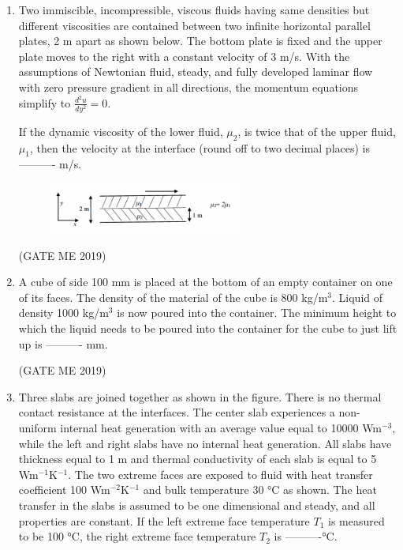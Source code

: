 \documentclass[journal]{IEEEtran}
\begin{document}
\begin{enumerate}
\item Two immiscible, incompressible, viscous fluids having same densities but different viscosities are contained between two infinite horizontal parallel plates, 2 m apart as shown below. The bottom plate is fixed and the upper plate moves to the right with a constant velocity of 3 m/s. With the assumptions of Newtonian fluid, steady, and fully developed laminar flow with zero pressure gradient in all directions, the momentum equations simplify to
$\frac{d^2 u}{dy^2} = 0.$

If the dynamic viscosity of the lower fluid, $\mu_2$, is twice that of the upper fluid, $\mu_1$, then the velocity at the interface (round off to two decimal places) is ---------- m/s.

\begin{figure}[H]
\centering
\includegraphics[width=0.6\textwidth]{Fig 17.png}
\caption{}
\label{fig:question45}
\end{figure}
\hfill (GATE ME 2019)

\item A cube of side 100 mm is placed at the bottom of an empty container on one of its faces. The density of the material of the cube is 800 kg/m$^3$. Liquid of density 1000 kg/m$^3$ is now poured into the container. The minimum height to which the liquid needs to be poured into the container for the cube to just lift up is ---------- mm.

\hfill (GATE ME 2019)

\item Three slabs are joined together as shown in the figure. There is no thermal contact resistance at the interfaces. The center slab experiences a non-uniform internal heat generation with an average value equal to 10000 Wm$^{-3}$, while the left and right slabs have no internal heat generation. All slabs have thickness equal to 1 m and thermal conductivity of each slab is equal to 5 Wm$^{-1}$K$^{-1}$. The two extreme faces are exposed to fluid with heat transfer coefficient 100 Wm$^{-2}$K$^{-1}$ and bulk temperature 30 °C as shown. The heat transfer in the slabs is assumed to be one dimensional and steady, and all properties are constant. If the left extreme face temperature $ T_1 $ is measured to be 100 °C, the right extreme face temperature $ T_2 $ is ----------°C.


\end{enumerate}
\end{document}

